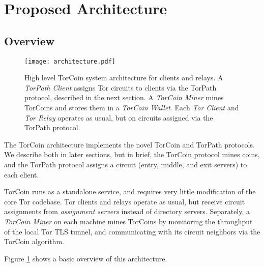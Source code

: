 \section{Proposed Architecture} \label{arch}

\subsection{Overview}

\begin{figure}
  \centering
    \texttt{[image: architecture.pdf]}
  \caption{High level TorCoin system architecture for clients and relays. A \textit{TorPath Client} assigns Tor circuits to clients via the TorPath protocol, described in the next section. A \textit{TorCoin Miner} mines TorCoins and stores them in a \textit{TorCoin Wallet}. Each \textit{Tor Client} and \textit{Tor Relay} operates as usual, but on circuits assigned via the TorPath protocol.}
  \label{figure:archi}
\end{figure}

The TorCoin architecture implements the novel TorCoin and TorPath protocols. We
describe both in later sections, but in brief, the TorCoin protocol mines
coins, and the TorPath protocol assigns a circuit (entry, middle, and exit
servers) to each client.

TorCoin runs as a standalone service, and requires very little modification of
the core Tor codebase. Tor clients and relays operate as usual, but receive
circuit assignments from \textit{assignment servers} instead of directory 
servers. Separately, a \textit{TorCoin Miner} on each machine mines TorCoins
by monitoring the throughput of the local Tor TLS tunnel, and communicating with its circuit neighbors via the TorCoin algorithm.

Figure \ref{figure:archi} shows a basic overview of this architecture.




